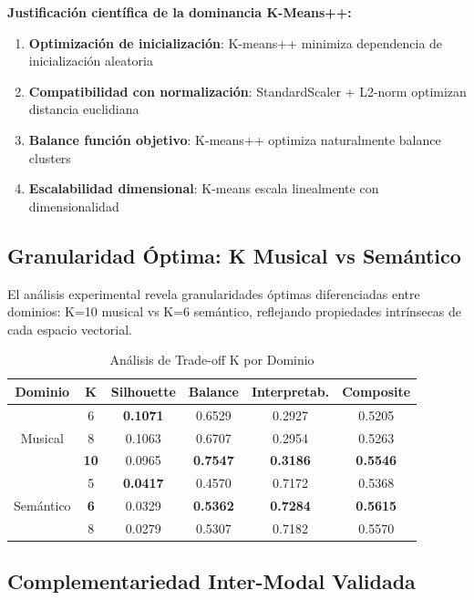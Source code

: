 \documentclass[12pt,a4paper]{report}
\begin{document}
\textbf{Justificación científica de la dominancia K-Means++:}
\begin{enumerate}
    \item \textbf{Optimización de inicialización}: K-means++ minimiza dependencia de inicialización aleatoria
    \item \textbf{Compatibilidad con normalización}: StandardScaler + L2-norm optimizan distancia euclidiana
    \item \textbf{Balance función objetivo}: K-means++ optimiza naturalmente balance clusters
    \item \textbf{Escalabilidad dimensional}: K-means escala linealmente con dimensionalidad
\end{enumerate}

\subsection{Granularidad Óptima: K Musical vs Semántico}

El análisis experimental revela granularidades óptimas diferenciadas entre dominios: K=10 musical vs K=6 semántico, reflejando propiedades intrínsecas de cada espacio vectorial.

\begin{table}[H]
\centering
\caption{Análisis de Trade-off K por Dominio}
\begin{tabular}{|c|c|c|c|c|c|}
\hline
\textbf{Dominio} & \textbf{K} & \textbf{Silhouette} & \textbf{Balance} & \textbf{Interpretab.} & \textbf{Composite} \\
\hline
\multirow{3}{*}{Musical} & 6 & \textbf{0.1071} & 0.6529 & 0.2927 & 0.5205 \\
\cline{2-6}
& 8 & 0.1063 & 0.6707 & 0.2954 & 0.5263 \\
\cline{2-6}
& \textbf{10} & 0.0965 & \textbf{0.7547} & \textbf{0.3186} & \textbf{0.5546} \\
\hline
\multirow{3}{*}{Semántico} & 5 & \textbf{0.0417} & 0.4570 & 0.7172 & 0.5368 \\
\cline{2-6}
& \textbf{6} & 0.0329 & \textbf{0.5362} & \textbf{0.7284} & \textbf{0.5615} \\
\cline{2-6}
& 8 & 0.0279 & 0.5307 & 0.7182 & 0.5570 \\
\hline
\end{tabular}
\end{table}

\subsection{Complementariedad Inter-Modal Validada}
\end{document}
